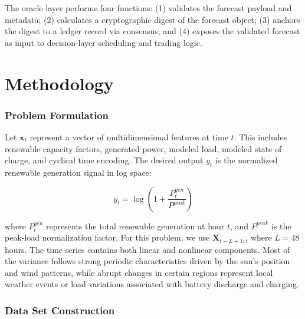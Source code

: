 \documentclass{ieeeaccess}
\begin{document}
The oracle layer performs four functions: (1) validates the forecast payload and metadata; (2) calculates a cryptographic digest of the forecast object; (3) anchors the digest to a ledger record via consensus; and (4) exposes the validated forecast as input to decision-layer scheduling and trading logic.

\section{Methodology}
\subsubsection{Problem Formulation}

Let $\mathbf{x}_{t}$ represent a vector of multidimensional features at time $t$. This includes renewable capacity factors, generated power, modeled load, modeled state of charge, and cyclical time encoding. The desired output $y_{t}$ is the normalized renewable generation signal in log space:

\begin{equation}
y_{t}=\log\left(1+\dfrac{P^{gen}_{t}}{P^{peak}}\right)
\end{equation}

where $P^{gen}_{t}$ represents the total renewable generation at hour $t$, and $P^{peak}$ is the peak-load normalization factor. For this problem, we use $\mathbf{X}_{t-L+1:t}$ where $L=48$ hours. The time series contains both linear and nonlinear components. Most of the variance follows strong periodic characteristics driven by the sun's position and wind patterns, while abrupt changes in certain regions represent local weather events or load variations associated with battery discharge and charging.

\subsubsection{Data Set Construction}
\end{document}
